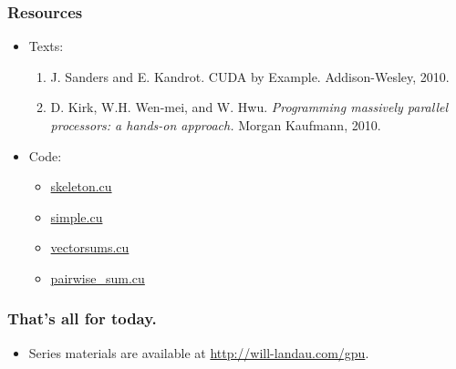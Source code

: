 \documentclass[handout]{beamer}
\numberwithin{equation}{section}
\begin{document}
\begin{frame}
\frametitle{Resources} \small

\begin{itemize}
\item Texts:
\begin{enumerate}
 \item J. Sanders and E. Kandrot. {CUDA by Example.} Addison-Wesley, 2010.
\pause \item D. Kirk, W.H. Wen-mei, and W. Hwu. \emph{Programming massively parallel processors: a hands-on approach.} Morgan Kaufmann, 2010.
\end{enumerate}
\pause \item Code:
\begin{itemize}
\item \href{http://will-landau.com/gpu/Code/CUDA_C/skeleton/skeleton.cu}{skeleton.cu}
\item \href{http://will-landau.com/gpu/Code/CUDA_C/simple/simple.cu}{simple.cu}
\item \href{http://will-landau.com/gpu/Code/CUDA_C/vectorsums/vectorsums.cu}{vectorsums.cu}
\item \href{http://will-landau.com/gpu/Code/CUDA_C/pairwise\_sum/pairwise\_sum.cu}{pairwise\_sum.cu}
\end{itemize}
\end{itemize}
\end{frame}


\begin{frame}
\frametitle{That's all for today.}
\begin{itemize}
\item Series materials are available at \url{http://will-landau.com/gpu}.
\end{itemize}
\end{frame}
\end{document}
